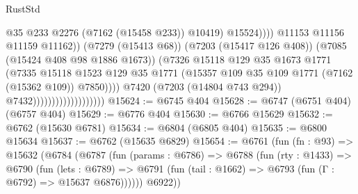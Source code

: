 \begin{lexlean}{RustStd}
\begin{coremodule}
                                                          @35
                                                          @233
                                                          @2276
                                                          (@7162 (@15458 @233))
                                                          @10419)
                                                        @15524))))
                                                @11153
                                                @11156
                                                @11159
                                                @11162))
                                            (@7279 (@15413 @68))
                                            (@7203 (@15417 @126 @408))
                                            (@7085 (@15424 @408 @98 @1886 @1673))
                                            (@7326
                                              @15118
                                              @129
                                              @35
                                              @1673
                                              @1771
                                              (@7335
                                                @15118
                                                @1523
                                                @129
                                                @35
                                                @1771
                                                (@15357
                                                  @109
                                                  @35
                                                  @109
                                                  @1771
                                                  (@7162 (@15362 @109))
                                                  @7850))))
                                          @7420
                                          (@7203 (@14804 @743 @294))
                                          @7432)))))))))))))))))))
@15624 := @6745 @404
@15628 := @6747 (@6751 @404) (@6757 @404)
@15629 := @6776 @404
@15630 := @6766 @15629
@15632 := @6762 (@15630 @6781)
@15634 := @6804 (@6805 @404)
@15635 := @6800 @15634
@15637 := @6762 (@15635 @6829)
@15654 := @6761
    (fun (fn : @93) =>
    @15632
      (@6784
        (@6787
          (fun (params : @6786) =>
          @6788
            (fun (rty : @1433) =>
            @6790
              (fun (lets : @6789) =>
              @6791 (fun (tail : @1662) => @6793 (fun (Γ : @6792) => @15637 @6876))))))
        @6922))

\end{coremodule}
\end{lexlean}
